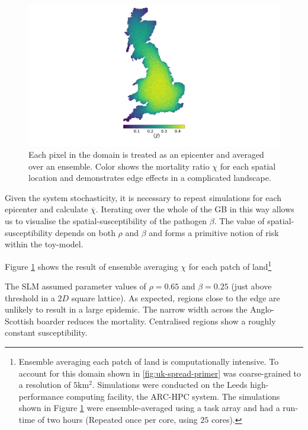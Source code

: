 \begin{figure}
    \centering
    \includegraphics[scale=0.32]{chapter4/figures/figure2.pdf}
    \caption{Each pixel in the domain is treated as an epicenter and averaged over an ensemble. %
    Color shows the mortality ratio $\chi$ for each spatial location and demonstrates edge effects %
    in a complicated landscape.}
    \label{fig:uk-spatial-risk}
\end{figure}

Given the system stochasticity, it is necessary to repeat simulations for each epicenter %
and calculate $\overline{\chi}$. Iterating over the whole of the GB in this way allows us 
to visualise the spatial-susceptibility of the pathogen $\beta$. %
The value of spatial-susceptibility depends on both $\rho$ and $\beta$ and forms a primitive %
notion of risk within the toy-model. %

Figure \ref{fig:uk-spatial-risk} shows the result of ensemble averaging $\chi$ for each %
patch of land\footnote{Ensemble averaging each patch of land is computationally intensive. %
To account for this domain shown in \ref{fig:uk-spread-primer} was coarse-grained to a resolution of $5\mathrm{km^2}$. %
Simulations were conducted on the Leeds high-performance computing facility, the ARC-HPC system. %
The simulations shown in Figure \ref{fig:uk-spatial-risk} were ensemble-averaged using a task %
array and had a run-time of two hours (Repeated once per core, using $25$ cores).} %

The SLM assumed parameter values of $\rho=0.65$ and $\beta=0.25$ (just above threshold in a $2D$ square lattice). %
As expected, regions close to the edge are unlikely to result in a large epidemic. %
The narrow width across the Anglo-Scottish boarder reduces the mortality. %
Centralised regions show a roughly constant susceptibility. %

